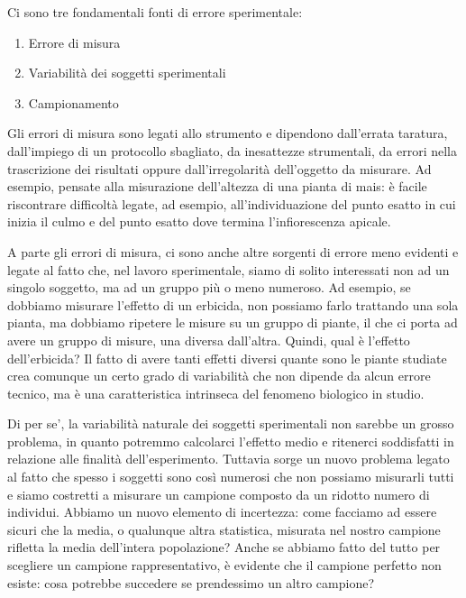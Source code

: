 \documentclass[
  12pt,
]{book}
\providecommand{\tightlist}{%
  \setlength{\itemsep}{0pt}\setlength{\parskip}{0pt}}
\begin{document}
Ci sono tre fondamentali fonti di errore sperimentale:

\begin{enumerate}
\def\labelenumi{\arabic{enumi}.}
\tightlist
\item
  Errore di misura
\item
  Variabilità dei soggetti sperimentali
\item
  Campionamento
\end{enumerate}

Gli errori di misura sono legati allo strumento e dipendono dall'errata taratura, dall'impiego di un protocollo sbagliato, da inesattezze strumentali, da errori nella trascrizione dei risultati oppure dall'irregolarità dell'oggetto da misurare. Ad esempio, pensate alla misurazione dell'altezza di una pianta di mais: è facile riscontrare difficoltà legate, ad esempio, all'individuazione del punto esatto in cui inizia il culmo e del punto esatto dove termina l'infiorescenza apicale.

A parte gli errori di misura, ci sono anche altre sorgenti di errore meno evidenti e legate al fatto che, nel lavoro sperimentale, siamo di solito interessati non ad un singolo soggetto, ma ad un gruppo più o meno numeroso. Ad esempio, se dobbiamo misurare l'effetto di un erbicida, non possiamo farlo trattando una sola pianta, ma dobbiamo ripetere le misure su un gruppo di piante, il che ci porta ad avere un gruppo di misure, una diversa dall'altra. Quindi, qual è l'effetto dell'erbicida? Il fatto di avere tanti effetti diversi quante sono le piante studiate crea comunque un certo grado di variabilità che non dipende da alcun errore tecnico, ma è una caratteristica intrinseca del fenomeno biologico in studio.

Di per se', la variabilità naturale dei soggetti sperimentali non sarebbe un grosso problema, in quanto potremmo calcolarci l'effetto medio e ritenerci soddisfatti in relazione alle finalità dell'esperimento. Tuttavia sorge un nuovo problema legato al fatto che spesso i soggetti sono così numerosi che non possiamo misurarli tutti e siamo costretti a misurare un campione composto da un ridotto numero di individui. Abbiamo un nuovo elemento di incertezza: come facciamo ad essere sicuri che la media, o qualunque altra statistica, misurata nel nostro campione rifletta la media dell'intera popolazione? Anche se abbiamo fatto del tutto per scegliere un campione rappresentativo, è evidente che il campione perfetto non esiste: cosa potrebbe succedere se prendessimo un altro campione?
\end{document}
